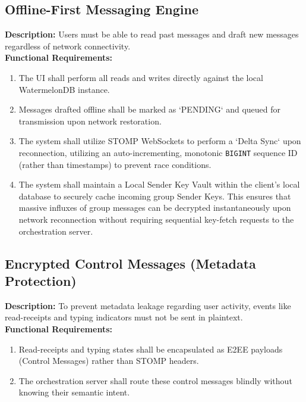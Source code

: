 \documentclass[12pt, a4paper]{article}
\begin{document}
\subsection{Offline-First Messaging Engine}
\textbf{Description:} Users must be able to read past messages and draft new messages regardless of network connectivity.\\
\textbf{Functional Requirements:}
\begin{enumerate}
    \item The UI shall perform all reads and writes directly against the local WatermelonDB instance.
    \item Messages drafted offline shall be marked as `PENDING` and queued for transmission upon network restoration.
    \item The system shall utilize STOMP WebSockets to perform a `Delta Sync` upon reconnection, utilizing an auto-incrementing, monotonic \texttt{BIGINT} sequence ID (rather than timestamps) to prevent race conditions.
    \item The system shall maintain a Local Sender Key Vault within the client's local database to securely cache incoming group Sender Keys. This ensures that massive influxes of group messages can be decrypted instantaneously upon network reconnection without requiring sequential key-fetch requests to the orchestration server.
\end{enumerate}

\subsection{Encrypted Control Messages (Metadata Protection)}
\textbf{Description:} To prevent metadata leakage regarding user activity, events like read-receipts and typing indicators must not be sent in plaintext.\\
\textbf{Functional Requirements:}
\begin{enumerate}
    \item Read-receipts and typing states shall be encapsulated as E2EE payloads (Control Messages) rather than STOMP headers.
    \item The orchestration server shall route these control messages blindly without knowing their semantic intent.
\end{enumerate}
\end{document}
